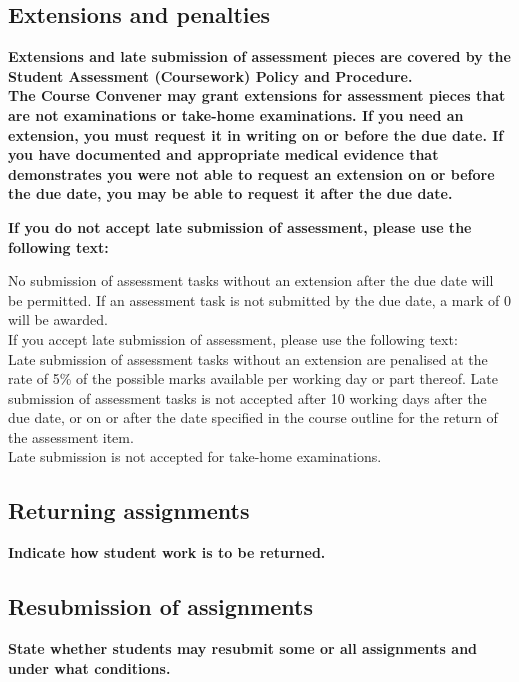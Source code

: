 \documentclass[11pt]{article}
\begin{document}
\subsection*{Extensions and penalties}
\textbf{Extensions and late submission of assessment pieces are covered by the Student Assessment (Coursework) Policy and Procedure.} \\

\textbf{The Course Convener may grant extensions for assessment pieces that are not examinations or take-home examinations. If you need an extension, you must request it in writing on or before the due date. If you have documented and appropriate medical evidence that demonstrates you were not able to request an extension on or before the due date, you may be able to request it after the due date.}\\

{\bfseries\color{red}If you do not accept late submission of assessment, please use the following text:

No submission of assessment tasks without an extension after the due date will be permitted. If an assessment task is not submitted by the due date, a mark of 0 will be awarded. \\

If you accept late submission of assessment, please use the following text: \\

Late submission of assessment tasks without an extension are penalised at the rate of 5\% of the possible marks available per working day or part thereof. Late submission of assessment tasks is not accepted after 10 working days after the due date, or on or after the date specified in the course outline for the return of the assessment item. \\

Late submission is not accepted for take-home examinations.}

\subsection*{Returning assignments}
\textbf{{\color{red}Indicate how student work is to be returned.}}

\subsection*{Resubmission of assignments}
\textbf{{\color{red}State whether students may resubmit some or all assignments and under what conditions.}}
\end{document}
